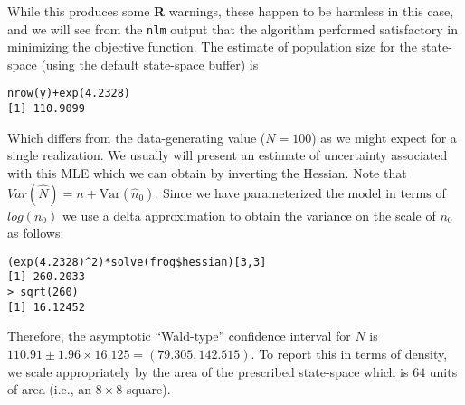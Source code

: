 While this produces some {\bf R} warnings, these happen to be harmless
in this case, and we will see from the \mbox{\tt nlm} output that the
algorithm performed satisfactory in minimizing the objective function.
The estimate of population size for the state-space (using the default 
state-space buffer) is
\begin{verbatim}
nrow(y)+exp(4.2328)
[1] 110.9099
\end{verbatim}
Which differs from the data-generating value ($N=100$) as we might
expect for a single realization. We usually will present an estimate of uncertainty associated
with this MLE which we can obtain by inverting the Hessian. Note that
$Var(\hat{N}) = n + \mbox{Var}(\hat{n}_{0})$.
Since we
have parameterized the model in terms of $log(n_{0})$ we use a delta
approximation to obtain the variance on the scale of $n_{0}$ as
follows:
\begin{verbatim}
(exp(4.2328)^2)*solve(frog$hessian)[3,3]
[1] 260.2033
> sqrt(260)
[1] 16.12452
\end{verbatim}
Therefore, the asymptotic ``Wald-type'' confidence interval for $N$ is
$110.91 \pm 1.96 \times 16.125 = (79.305, 142.515)$. To report this in
terms of density, we scale appropriately by the area of the prescribed
state-space which is $64$ units of area (i.e., an $8 \times 8$ square).


\begin{comment}

\subsection{Exercises}

{\flushleft 
{\bf 1.}	
Run the analysis with different state-space buffers and comment on the result. 
}


{\flushleft 
{\bf 2.} Conduct a brief simulation study using this code by
  simulating 100 data sets and obtain the MLEs for each data set. Do
  things seem to be working as you expect?  }

{\flushleft 
{\bf 3.} 
Further extensions: It should be straightforward to
  generalize the integrated likelihood function to accommodate many
  different situations. For examples, if we want to include more
  covariates in the model we can just add stuff to the object \mbox{\tt probcap},
 and add the relevant parameters to the argument that gets
  passed to the main  function.  For the simulated data, make up a
  covariate by generating a Bernoulli covariate (``trap type'' – perhaps
  baited or not baited) randomly and try to modify the likelihood to
  accommodate that.  }

{\flushleft {\bf 4.}  We would probably be interested in devising the
  integrated likelihood for the full 3-d encounter history array so
  that we could include temporally varying covariates. This is not
  difficult but naturally will slow down the execution
  substantially. The interested reader should try to expand the
  capabilities of this basic {\bf R} function.  }
\end{comment}




